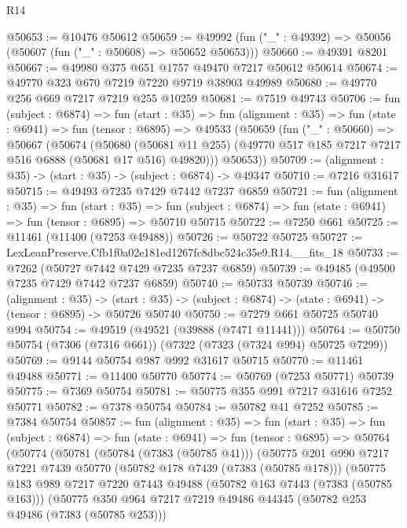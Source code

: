 \begin{lexlean}{R14}
\begin{coremodule}
@50653 := @10476 @50612
@50659 := @49992 (fun ("_" : @49392) => @50056 (@50607 (fun ("_" : @50608) => @50652 @50653)))
@50660 := @49391 @8201
@50667 := @49980 @375 @651 @1757 @49470 @7217 @50612 @50614
@50674 := @49770 @323 @670 @7219 @7220 @9719 @38903 @49989
@50680 := @49770 @256 @669 @7217 @7219 @255 @10259
@50681 := @7519 @49743
@50706 := fun (subject : @6874) =>
  fun (start : @35) =>
  fun (alignment : @35) =>
  fun (state : @6941) =>
  fun (tensor : @6895) =>
  @49533
    (@50659
      (fun ("_" : @50660) =>
      @50667
        (@50674
          (@50680
            (@50681 @11 @255)
            (@49770 @517 @185 @7217 @7217 @516 @6888 (@50681 @17 @516) @49820)))
        @50653))
@50709 := (alignment : @35) -> (start : @35) -> (subject : @6874) -> @49347
@50710 := @7216 @31617
@50715 := @49493 @7235 @7429 @7442 @7237 @6859
@50721 := fun (alignment : @35) =>
  fun (start : @35) =>
  fun (subject : @6874) => fun (state : @6941) => fun (tensor : @6895) => @50710 @50715
@50722 := @7250 @661
@50725 := @11461 (@11400 (@7253 @49488))
@50726 := @50722 @50725
@50727 := LexLeanPreserve.Cfb1f0a02e181ed1267fc8dbc524c35e9.R14.__fits_18
@50733 := @7262 (@50727 @7442 @7429 @7235 @7237 @6859)
@50739 := @49485 (@49500 @7235 @7429 @7442 @7237 @6859)
@50740 := @50733 @50739
@50746 := (alignment : @35) ->
  (start : @35) -> (subject : @6874) -> (state : @6941) -> (tensor : @6895) -> @50726 @50740
@50750 := @7279 @661 @50725 @50740 @994
@50754 := @49519 (@49521 (@39888 (@7471 @11441)))
@50764 := @50750 @50754 (@7306 (@7316 @661)) (@7322 (@7323 (@7324 @994) @50725 @7299))
@50769 := @9144 @50754 @987 @992 @31617 @50715
@50770 := @11461 @49488
@50771 := @11400 @50770
@50774 := @50769 (@7253 @50771) @50739
@50775 := @7369 @50754
@50781 := @50775 @355 @991 @7217 @31616 @7252 @50771
@50782 := @7378 @50754
@50784 := @50782 @41 @7252
@50785 := @7384 @50754
@50857 := fun (alignment : @35) =>
  fun (start : @35) =>
  fun (subject : @6874) =>
  fun (state : @6941) =>
  fun (tensor : @6895) =>
  @50764
    (@50774
      (@50781
        (@50784 (@7383 (@50785 @41)))
        (@50775
          @201
          @990
          @7217
          @7221
          @7439
          @50770
          (@50782 @178 @7439 (@7383 (@50785 @178)))
          (@50775
            @183
            @989
            @7217
            @7220
            @7443
            @49488
            (@50782 @163 @7443 (@7383 (@50785 @163)))
            (@50775
              @350
              @964
              @7217
              @7219
              @49486
              @44345
              (@50782 @253 @49486 (@7383 (@50785 @253)))

\end{coremodule}
\end{lexlean}
